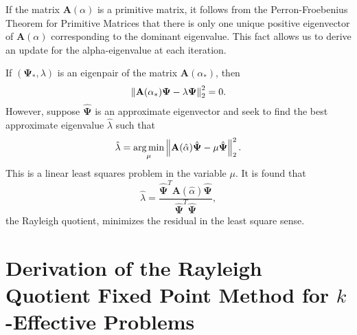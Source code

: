 If the matrix $\mathbf{A}(\alpha)$ is a primitive matrix, it follows from the Perron-Froebenius Theorem for Primitive Matrices that there is only one unique positive eigenvector of $\mathbf{A}(\alpha)$ corresponding to the dominant eigenvalue. This fact allows us to derive an update for the alpha-eigenvalue at each iteration.

If $(\mathbf{\Psi}_{*}, \lambda)$ is an eigenpair of the matrix $\mathbf{A}(\alpha_{*})$, then
\begin{equation}
\left\lVert\mathbf{A}(\alpha_{*}) \mathbf{\Psi} - \lambda \mathbf{\Psi}\right\rVert_{2}^{2} = 0.
\end{equation}
However, suppose $\hat{\mathbf{\Psi}}$ is an approximate eigenvector and seek to find the best approximate eigenvalue $\hat{\lambda}$ such that
\begin{equation}
\hat{\lambda} = \operatorname*{arg\,min}_{\mu} \left\lVert\mathbf{A}(\hat{\alpha}) \hat{\mathbf{\Psi}} - \mu \hat{\mathbf{\Psi}}\right\rVert_{2}^{2}. 
\end{equation}
This is a linear least squares problem in the variable $\mu$. It is found that \cite{horn_matrix_2012}
\begin{equation}
	\hat{\lambda} = \frac{\hat{\mathbf{\Psi}}^{T} \mathbf{A}(\hat{\alpha}) \hat{\mathbf{\Psi}}}{\hat{\mathbf{\Psi}}^{T} \hat{\mathbf{\Psi}}},
\end{equation}
the Rayleigh quotient, minimizes the residual in the least square sense.



\section{Derivation of the Rayleigh Quotient Fixed Point Method for $k$-Effective Problems}